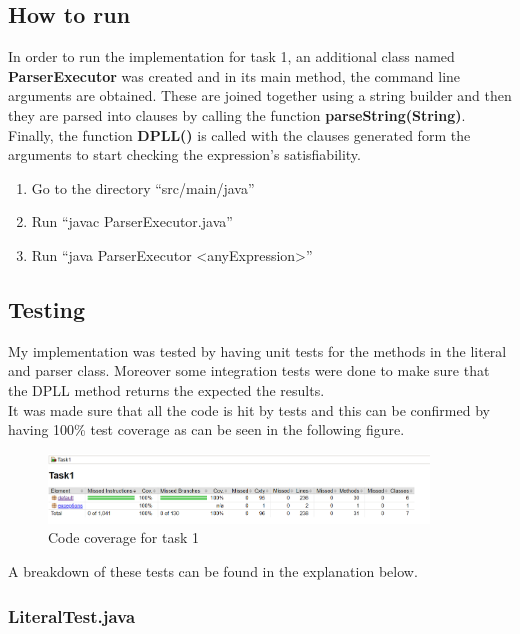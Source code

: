 \documentclass{article}
\newcommand{\quotes}[1]{``#1''}
\begin{document}
		
\subsection{How to run}

In order to run the implementation for task 1, an additional class named \textbf{ParserExecutor} was created and in its main method, the command line arguments are obtained. These are joined together using a string builder and then they are parsed into clauses by calling the function \textbf{parseString(String)}. Finally, the function \textbf{DPLL()} is called with the clauses generated form the arguments to start checking the expression's satisfiability. 

\begin{enumerate}
\item Go to the directory \quotes{src/main/java}
\item Run \quotes{javac ParserExecutor.java}
\item Run \quotes{java ParserExecutor \textless anyExpression\textgreater}
\end{enumerate}

		\subsection{Testing}
		
	My implementation was tested by having unit tests for the methods in the literal and parser class. Moreover some integration tests were done to make sure that the DPLL method returns the expected the results.\\
	It was made sure that all the code is hit by tests and this can be confirmed by having 100\% test coverage as can be seen in the following figure.
	
		\begin{figure}[H]
					\centering
			 			\includegraphics[width=0.9\textwidth]{task1cov.png}
			 			\centering
			  			\caption{Code coverage for task 1}
			  			\label{fig:task1cov}
					\end{figure}
	
	
	A breakdown of these tests can be found in the explanation below.

	\subsubsection{LiteralTest.java}
	
\end{document}
